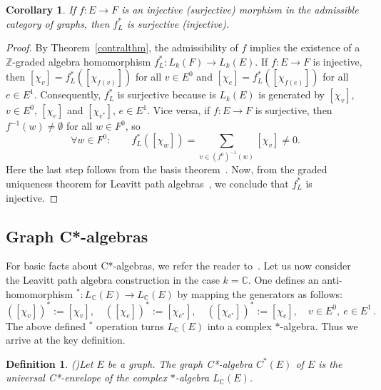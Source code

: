 \documentclass[12pt,times,a4paper]{amsart}
\newtheorem{corollary}[theorem]{Corollary}
\newtheorem{definition}[theorem]{Definition}
\numberwithin{equation}{section}
\numberwithin{equation}{section}
\begin{document}
\begin{corollary}\label{injsurcor}
If $f:E\to F$ is an injective (surjective) morphism in the admissible category of graphs, then $f^*_L$ is surjective (injective).
\end{corollary}
\begin{proof}
By Theorem~\ref{contralthm}, the admissibility of $f$ implies the existence of a $\mathbb{Z}$-graded algebra homomorphism $f^*_L:L_k(F)\to L_k(E)$. If $f:E\to F$ is 
injective, then $[\chi_v]=f^*_L([\chi_{f(v)}])$ for all $v\in E^0$ and $[\chi_e]=f^*_L([\chi_{f(e)}])$ for all $e\in E^1$. Consequently, $f^*_L$ is surjective because is 
$L_k(E)$ is generated by $[\chi_v]$, $v\in E^0$, $[\chi_e]$ and $[\chi_{e^*}]$, $e\in E^1$. Vice versa, if $f:E\to F$ is surjective, then $f^{-1}(w)\neq\emptyset$ for all 
$w\in F^0$, so
\begin{equation}
\forall w\in F^0:\qquad f^*_L([\chi_w])=\sum_{v\in (f^0)^{-1}(w)}[\chi_v]\neq 0.
\end{equation}
Here the last step follows from the basis theorem~\cite[Corollary~1.5.12]{aasm17}. Now, from the graded uniqueness theorem for Leavitt path algebras~\cite[Theorem~2.2.15]{aasm17}, we conclude that $f^*_L$ is injective. 
\end{proof}

\subsection{Graph C*-algebras}
For basic facts about C*-algebras, we refer the reader to~\cite{j-d77}. Let us now consider the Leavitt path algebra construction in 
the case $k=\mathbb{C}$. One defines an anti-homomorphism ${}^*:L_\mathbb{C}(E)\to L_\mathbb{C}(E)$ by mapping the generators as follows: 
\begin{equation}
([\chi_v])^*:=[\chi_v],\quad ([\chi_e])^*:=[\chi_{e^*}],\quad ([\chi_{e^*}])^*:=[\chi_e],\quad v\in E^0,~e\in E^1\,.
\end{equation}
The above defined ${}^*$ operation turns $L_\mathbb{C}(E)$ into a complex $*$-algebra. Thus we arrive at the key definition.
\begin{definition}{{\rm (}\cite[Definition~5.2.1]{aasm17}{\rm )}}\label{graphc*}
Let $E$ be a graph. The {\em graph C*-algebra} $C^*(E)$ of $E$ is the universal C*-envelope of the complex $*$-algebra 
$L_\mathbb{C}(E)$.
\end{definition}
\end{document}
